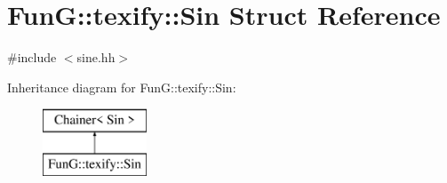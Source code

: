 \hypertarget{structFunG_1_1texify_1_1Sin}{\section{Fun\-G\-:\-:texify\-:\-:Sin Struct Reference}
\label{structFunG_1_1texify_1_1Sin}
}


{\ttfamily \#include $<$sine.\-hh$>$}

Inheritance diagram for Fun\-G\-:\-:texify\-:\-:Sin\-:\begin{figure}[H]
\begin{center}
\leavevmode
\includegraphics[height=2.000000cm]{structFunG_1_1texify_1_1Sin}
\end{center}
\end{figure}
